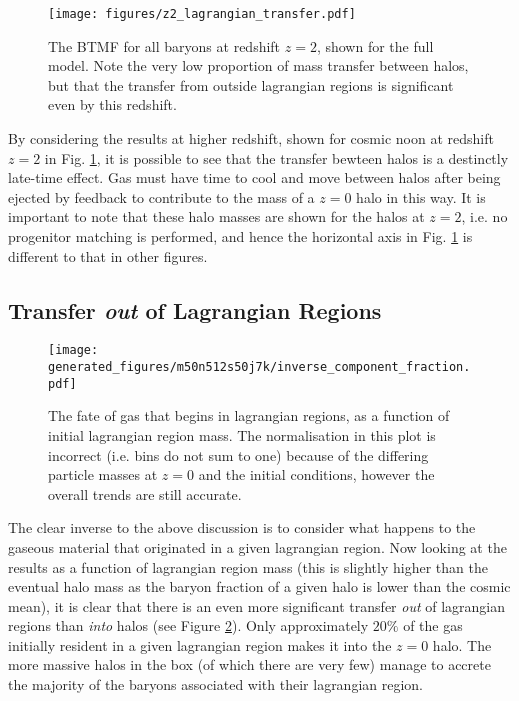 \begin{figure}
	\centering
	\texttt{[image: figures/z2\_lagrangian\_transfer.pdf]}
	\vspace{-0.7cm}
	\caption{The BTMF for all baryons at redshift $z=2$, shown for
	the full \simba{} model. Note the very low proportion of mass transfer
	between halos, but that the transfer from outside lagrangian regions
	is significant even by this redshift.}
	\label{fig:z2resultlt}
\end{figure}

By considering the results at higher redshift, shown for cosmic noon at redshift
$z=2$ in Fig. \ref{fig:z2resultlt}, it is possible to see that the transfer
bewteen halos is a destinctly late-time effect. Gas must have time to cool and
move between halos after being ejected by feedback to contribute to the mass
of a $z=0$ halo in this way. It is important to note that these halo masses are
shown for the halos at $z=2$, i.e. no progenitor matching is performed, and hence
the horizontal axis in Fig. \ref{fig:z2resultlt} is different to that in other
figures.

\subsection{Transfer \emph{out} of Lagrangian Regions}

\begin{figure}
	\centering
	\texttt{[image: generated\_figures/m50n512s50j7k/inverse\_component\_fraction.pdf]}
	\vspace{-0.7cm}
	\caption{The fate of gas that begins in lagrangian regions, as a function of
	initial lagrangian region mass. The normalisation in this plot is incorrect
	(i.e. bins do not sum to one) because of the differing particle masses at 
	$z=0$ and the initial conditions, however the overall trends are still 
	accurate.  }
	\label{fig:transferoutoflrs}
\end{figure}

The clear inverse to the above discussion is to consider what happens to the gaseous
material that originated in a given lagrangian region. Now looking at the results as
a function of lagrangian region mass (this is slightly higher than the eventual
halo mass as the baryon fraction of a given halo is lower than the cosmic mean), it
is clear that there is an even more significant transfer \emph{out} of lagrangian
regions than \emph{into} halos (see Figure \ref{fig:transferoutoflrs}). Only 
approximately $20\%$ of the gas initially resident in a given lagrangian region
makes it into the $z=0$ halo. The more massive halos in the box (of which there 
are very few) manage to accrete the majority of the baryons associated with their
lagrangian region.


